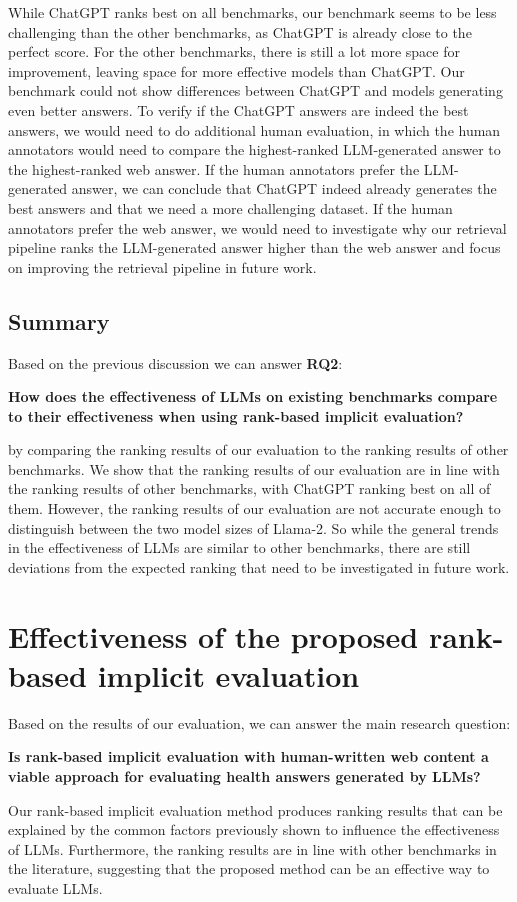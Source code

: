 While ChatGPT ranks best on all benchmarks, our benchmark seems to be less challenging than the other benchmarks, as ChatGPT is already close to the perfect score.
For the other benchmarks, there is still a lot more space for improvement, leaving space for more effective models than ChatGPT.
Our benchmark could not show differences between ChatGPT and models generating even better answers.
To verify if the ChatGPT answers are indeed the best answers, we would need to do additional human evaluation, in which the human annotators would need to compare the highest-ranked LLM-generated answer to the highest-ranked web answer.
If the human annotators prefer the LLM-generated answer, we can conclude that ChatGPT indeed already generates the best answers and that we need a more challenging dataset.
If the human annotators prefer the web answer, we would need to investigate why our retrieval pipeline ranks the LLM-generated answer higher than the web answer and focus on improving the retrieval pipeline in future work.

\subsection{Summary}
Based on the previous discussion we can answer \textbf{RQ2}:
\begin{center}
    \textbf{How does the effectiveness of LLMs on existing benchmarks compare to their effectiveness when using rank-based implicit evaluation?}
\end{center}
by comparing the ranking results of our evaluation to the ranking results of other benchmarks.
We show that the ranking results of our evaluation are in line with the ranking results of other benchmarks, with ChatGPT ranking best on all of them.
However, the ranking results of our evaluation are not accurate enough to distinguish between the two model sizes of Llama-2.
So while the general trends in the effectiveness of LLMs are similar to other benchmarks, there are still deviations from the expected ranking that need to be investigated in future work.

\section{Effectiveness of the proposed rank-based implicit evaluation}
Based on the results of our evaluation, we can answer the main research question:
\begin{center}
    \textbf{Is rank-based implicit evaluation with human-written web content a viable approach for evaluating health answers generated by LLMs?}
\end{center}
Our rank-based implicit evaluation method produces ranking results that can be explained by the common factors previously shown to influence the effectiveness of LLMs.
Furthermore, the ranking results are in line with other benchmarks in the literature, suggesting that the proposed method can be an effective way to evaluate LLMs.

